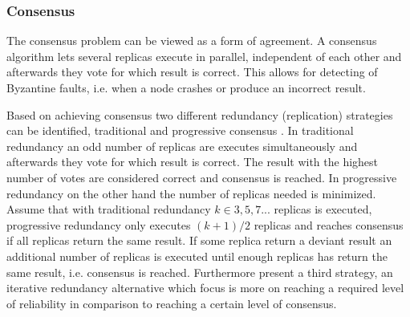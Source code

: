 \documentclass{cslthse-msc}
\begin{document}
\subsubsection*{Consensus}
The consensus problem can be viewed as a form of agreement. A consensus algorithm lets several replicas execute in parallel, independent of each other and afterwards they vote for which result is correct. This allows for detecting of Byzantine faults, i.e. when a node crashes or produce an incorrect result.

Based on achieving consensus two different redundancy (replication) strategies can be identified, traditional and progressive consensus \cite{selfAdaptRel}. In traditional redundancy an odd number of replicas are executes simultaneously and afterwards they vote for which result is correct. The result with the highest number of votes are considered correct and consensus is reached. %
In progressive redundancy on the other hand the number of replicas needed is minimized. Assume that with traditional redundancy $k \in {3,5,7...}$ replicas is executed, progressive redundancy only executes $(k+1)/2$ replicas and reaches consensus if all replicas return the same result. If some replica return a deviant result an additional number of replicas is executed until enough replicas has return the same result, i.e. consensus is reached. 
Furthermore \cite{selfAdaptRel} present a third strategy, an iterative redundancy alternative which focus is more on reaching a required level of reliability in comparison to reaching a certain level of consensus.
\end{document}
